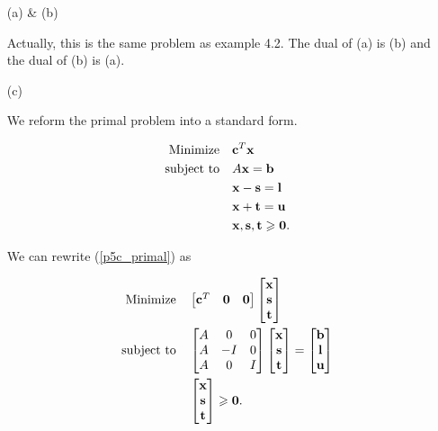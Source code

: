 \documentclass[12pt]{article}
\begin{document}
\begin{enumerate}
\item [(a) \& (b)]

Actually, this is the same problem as example 4.2. The dual of (a) is (b) and the dual of (b) is (a).

\item [(c)]

We reform the primal problem into a standard form.

\begin{equation}\label{p5c_primal}
\begin{aligned}
 \quad \text{Minimize} \quad & \textbf c^T\textbf x\\
\text{subject\  to} \quad & A\textbf x = \textbf b \\
& \textbf x - \textbf s = \textbf l \\
& \textbf x + \textbf t = \textbf u \\
& \textbf x, \textbf s, \textbf t \geqslant \textbf 0.
\end{aligned}
\end{equation}

We can rewrite (\ref{p5c_primal}) as

\begin{equation}\label{p5c_primal_std}
\begin{aligned}
\quad \text{Minimize} \quad & \begin{bmatrix}
\textbf c^T & \textbf 0 & \textbf 0
\end{bmatrix}\begin{bmatrix}
\textbf x \\ \textbf s \\ \textbf t
\end{bmatrix}\\
\text{subject\  to} \quad &\begin{bmatrix}
A & 0 & 0 \\
A & -I & 0 \\
A & 0 & I
\end{bmatrix}
\begin{bmatrix}
\textbf x \\ \textbf s \\ \textbf t
\end{bmatrix} = \begin{bmatrix}
\textbf b \\ \textbf l \\ \textbf u
\end{bmatrix} \\
&  \begin{bmatrix}
\textbf x \\ \textbf s \\ \textbf t
\end{bmatrix}\geqslant \textbf 0.
\end{aligned}
\end{equation}


\end{enumerate}
\end{document}
